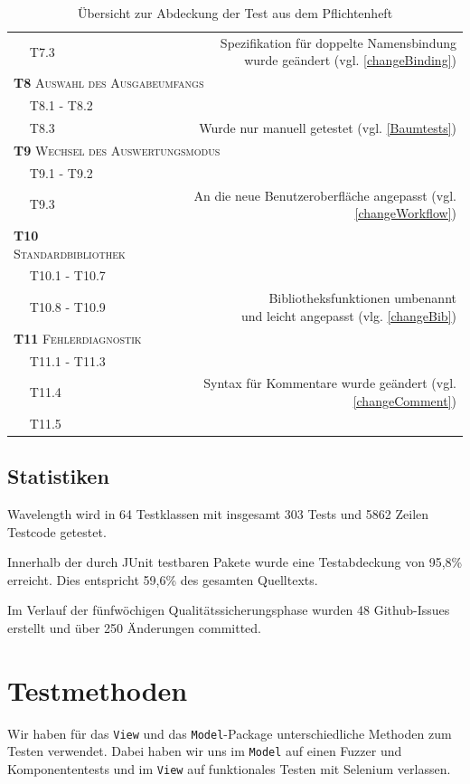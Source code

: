 \documentclass[parskip=full,11pt,openany]{scrreprt}
\newcommand{\cmark}{\ding{51}}%
\newcommand{\xmark}{\ding{55}}%
\begin{document}
\begin{table}[h]
\begin{tabular}{@{}ll|c|r@{}}
		&T7.3 & \cmark & \makecell[r]{Spezifikation für doppelte Namensbindung\\wurde geändert (vgl. \ref{changeBinding})} \\
		\multicolumn{4}{l}{\small \textsc{\textbf{T8} Auswahl des Ausgabeumfangs}}\\ 
		&T8.1 - T8.2 & \cmark & \\
		&T8.3 & \xmark & Wurde nur manuell getestet (vgl. \ref{Baumtests})\\
		\multicolumn{4}{l}{\small \textsc{\textbf{T9} Wechsel des Auswertungsmodus}}\\ 
		&T9.1 - T9.2 & \cmark & \\
		&T9.3 & \cmark & An die neue Benutzeroberfläche angepasst  (vgl. \ref{changeWorkflow})\\
		\multicolumn{3}{l|}{\small \textsc{\textbf{T10} Standardbibliothek}}\\ 
		&T10.1 - T10.7 & \cmark & \\
		&T10.8 - T10.9 & \cmark & \makecell[r]{Bibliotheksfunktionen umbenannt\\und leicht angepasst (vlg. \ref{changeBib})} \\
		\multicolumn{3}{l|}{\small \textsc{\textbf{T11} Fehlerdiagnostik}}\\ 
		&T11.1 - T11.3 & \cmark & \\
		&T11.4 & \cmark & Syntax für Kommentare wurde geändert (vgl. \ref{changeComment}) \\
		&T11.5 & \cmark & \\
		\bottomrule
	\end{tabular}
	\caption{Übersicht zur Abdeckung der Test aus dem Pflichtenheft}
\end{table}

\section{Statistiken}

Wavelength wird in 64 Testklassen mit insgesamt 303 Tests
und 5862 Zeilen Testcode getestet.

Innerhalb der durch JUnit testbaren Pakete wurde eine 
Testabdeckung von 95,8\% erreicht. Dies entspricht 59,6\%
des gesamten Quelltexts.

Im Verlauf der fünfwöchigen Qualitätssicherungsphase wurden
48 Github-Issues erstellt und über 250 Änderungen committed.


\chapter{Testmethoden}
Wir haben für das \texttt{View} und das \texttt{Model}-Package unterschiedliche
Methoden zum Testen verwendet. Dabei haben wir uns im \texttt{Model} auf einen
Fuzzer und Komponententests und im \texttt{View} auf funktionales Testen mit
Selenium verlassen.
\end{document}

